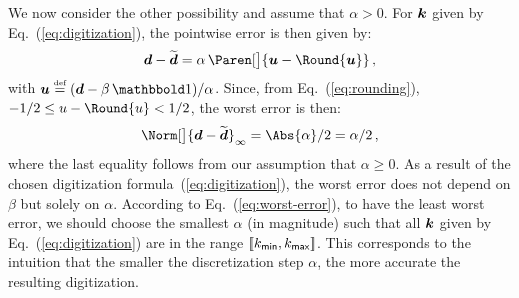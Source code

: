 \documentclass[]{article}
\newcommand*{\IntRange}[1]{[\![#1]\!]}
\renewcommand*{\proxy}[1]{\widetilde{#1}}
\begin{document}
We now consider the other possibility and assume that $\alpha > 0$.  For $\boldsymbol{k}$
given by Eq.~(\ref{eq:digitization}), the pointwise error is then given by:
\begin{displaymath}
  \V d - \proxy{\V d} = \alpha\,\Paren[\big]{\V u - \Round{\V u}} \, ,
\end{displaymath}
with $\V u \bydef (\V d - \beta\,\One)/\alpha$.  Since, from
Eq.~(\ref{eq:rounding}), $-1/2 \le u - \Round{u} < 1/2$, the worst error is
then:
\begin{equation}
  \label{eq:worst-error}
  \Norm[\big]{\V d - \proxy{\V d}}_{\infty} = \Abs{\alpha}/2 = \alpha/2 \, ,
\end{equation}
where the last equality follows from our assumption that $\alpha \ge 0$.  As a
result of the chosen digitization formula~(\ref{eq:digitization}), the worst
error does not depend on $\beta$ but solely on $\alpha$.  According to
Eq.~(\ref{eq:worst-error}), to have the least worst error, we should choose the
smallest $\alpha$ (in magnitude) such that all $\boldsymbol{k}$ given by
Eq.~(\ref{eq:digitization}) are in the range
$\IntRange{k_\Tag{min},k_\Tag{max}}$.  This corresponds to the intuition that
the smaller the discretization step $\alpha$, the more accurate the resulting
digitization.
\end{document}
